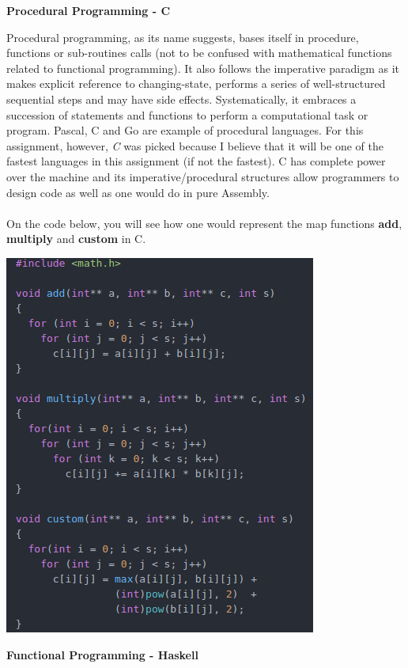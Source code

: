 \documentclass[conference]{IEEEtran}
\begin{document}
\textbf{ Procedural Programming - C }

Procedural programming, as its name suggests, bases itself in procedure, functions or sub-routines calls (not to be confused with mathematical functions related to functional programming). It also follows the imperative paradigm as it makes explicit reference to changing-state, performs a series of well-structured sequential steps and may have side effects. Systematically, it embraces a succession of statements and functions to perform a computational task or program. Pascal, C and Go are example of procedural languages. For this assignment, however, \textit{C} was picked because I believe that it will be one of the fastest languages in this assignment (if not the fastest). C has complete power over the machine and its imperative/procedural structures allow programmers to design code as well as one would do in pure Assembly.
\\\\
On the code below, you will see how one would represent the map functions \textbf{add}, \textbf{multiply} and \textbf{custom} in C.

\includegraphics[scale=0.62]{c_code}

\textbf{ Functional Programming - Haskell }
\end{document}
